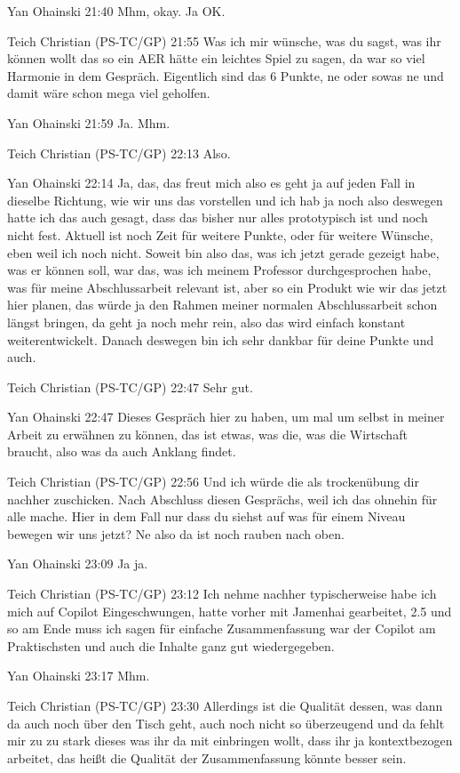 Yan Ohainski   21:40
Mhm, okay.
Ja OK.

Teich Christian (PS-TC/GP)   21:55
Was ich mir wünsche, was du sagst, was ihr können wollt das so ein AER hätte ein leichtes Spiel zu sagen, da war so viel Harmonie in dem Gespräch. Eigentlich sind das 6 Punkte, ne oder sowas ne und damit wäre schon mega viel geholfen.

Yan Ohainski   21:59
Ja.
Mhm.

Teich Christian (PS-TC/GP)   22:13
Also.

Yan Ohainski   22:14
Ja, das, das freut mich also es geht ja auf jeden Fall in dieselbe Richtung, wie wir uns das vorstellen und ich hab ja noch also deswegen hatte ich das auch gesagt, dass das bisher nur alles prototypisch ist und noch nicht fest. Aktuell ist noch Zeit für weitere Punkte, oder für weitere Wünsche, eben weil ich noch nicht.
Soweit bin also das, was ich jetzt gerade gezeigt habe, was er können soll, war das, was ich meinem Professor durchgesprochen habe, was für meine Abschlussarbeit relevant ist, aber so ein Produkt wie wir das jetzt hier planen, das würde ja den Rahmen meiner normalen Abschlussarbeit schon längst bringen, da geht ja noch mehr rein, also das wird einfach konstant weiterentwickelt. Danach deswegen bin ich sehr dankbar für deine Punkte und auch.

Teich Christian (PS-TC/GP)   22:47
Sehr gut.

Yan Ohainski   22:47
Dieses Gespräch hier zu haben, um mal um selbst in meiner Arbeit zu erwähnen zu können, das ist etwas, was die, was die Wirtschaft braucht, also was da auch Anklang findet.

Teich Christian (PS-TC/GP)   22:56
Und ich würde die als trockenübung dir nachher zuschicken. Nach Abschluss diesen Gesprächs, weil ich das ohnehin für alle mache. Hier in dem Fall nur dass du siehst auf was für einem Niveau bewegen wir uns jetzt? Ne also da ist noch rauben nach oben.

Yan Ohainski   23:09
Ja ja.

Teich Christian (PS-TC/GP)   23:12
Ich nehme nachher typischerweise habe ich mich auf Copilot Eingeschwungen, hatte vorher mit Jamenhai gearbeitet, 2.5 und so am Ende muss ich sagen für einfache Zusammenfassung war der Copilot am Praktischsten und auch die Inhalte ganz gut wiedergegeben.

Yan Ohainski   23:17
Mhm.

Teich Christian (PS-TC/GP)   23:30
Allerdings ist die Qualität dessen, was dann da auch noch über den Tisch geht, auch noch nicht so überzeugend und da fehlt mir zu zu stark dieses was ihr da mit einbringen wollt, dass ihr ja kontextbezogen arbeitet, das heißt die Qualität der Zusammenfassung könnte besser sein.

